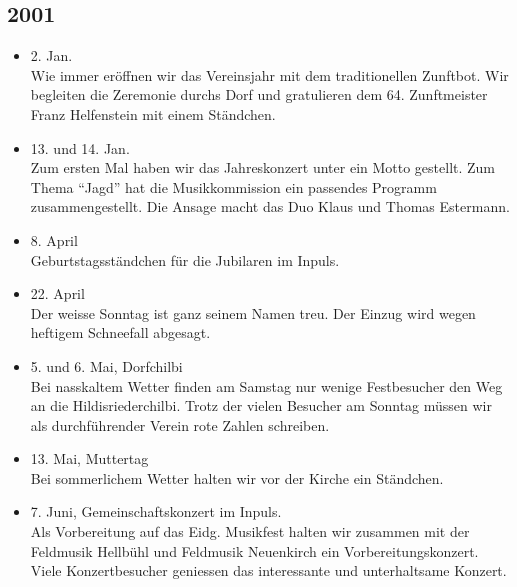 \subsection*{2001}
\begin{history}

    \begin{itemize}

        \item 2. Jan.\\
              Wie immer eröffnen wir das Vereinsjahr mit dem traditionellen Zunftbot.
              Wir begleiten die Zeremonie durchs Dorf und gratulieren dem 64.
              Zunftmeister Franz Helfenstein mit einem Ständchen.

        \item 13. und 14. Jan.\\
              Zum ersten Mal haben wir das Jahreskonzert unter ein Motto gestellt. Zum
              Thema \enquote{Jagd} hat die Musikkommission ein passendes Programm
              zusammengestellt. Die Ansage macht das Duo Klaus und Thomas Estermann.

        \item 8. April\\
              Geburtstagsständchen für die Jubilaren im Inpuls.

        \item 22. April\\
              Der weisse Sonntag ist ganz seinem Namen treu. Der Einzug wird wegen
              heftigem Schneefall abgesagt.

        \item 5. und 6. Mai, Dorfchilbi\\
              Bei nasskaltem Wetter finden am Samstag nur wenige Festbesucher den Weg
              an die Hildisriederchilbi. Trotz der vielen Besucher am Sonntag müssen
              wir als durchführender Verein rote Zahlen schreiben.

        \item 13. Mai, Muttertag\\
              Bei sommerlichem Wetter halten wir vor der Kirche ein Ständchen.

        \item 7. Juni,  Gemeinschaftskonzert im Inpuls. \\
              Als Vorbereitung auf das Eidg. Musikfest halten wir zusammen mit der
              Feldmusik Hellbühl und Feldmusik Neuenkirch ein Vorbereitungskonzert.
              Viele Konzertbesucher geniessen das interessante und unterhaltsame
              Konzert.


\end{itemize}
\end{history}
